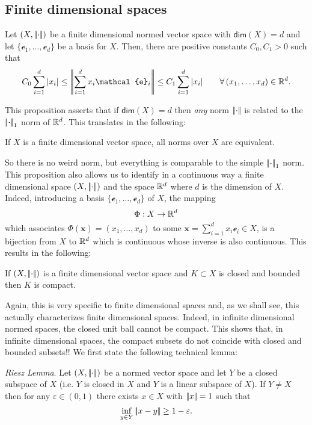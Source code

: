\documentclass{article}
\begin{document}
\subsection{Finite dimensional spaces}
\begin{proposition}
	Let $(X,\left|\negthinspace\left|\cdot\right|\negthinspace\right|)$ be a finite dimensional normed vector space with $\mathsf{dim}(X)=d$ and let $\{\mathcal{e}_1,\ldots,\mathcal{e}_d\}$ be a basis for $X$. Then, there are positive constants $C_0,C_1>0$ such that
	\begin{equation*}
		C_0\sum_{i=1}^{d}|x_i|\leq\norm{\sum_{i=1}^{d}x_i\mathcal{e}_{i}}\leq C_1\sum_{i=1}^{d}|x_i|\qquad\every(x_1,\ldots,x_d)\in\R^{d}.
	\end{equation*}
\end{proposition}
This proposition asserts that if $\mathsf{dim}(X)=d$ then \textit{any} norm $\left|\negthinspace\left|\cdot\right|\negthinspace\right|$ is related to the $\left|\negthinspace\left|\cdot\right|\negthinspace\right|_1$ norm of $\mathbb{R}^{d}$. This translates in the following:
\begin{proposition}
	If $X$ is a finite dimensional vector space, all norms over $X$ are equivalent.
\end{proposition}
So there is no weird norm, but everything is comparable to the simple $\left|\negthinspace\left|\cdot\right|\negthinspace\right|_1$ norm. This proposition also allows us to identify in a continuous way a finite dimensional space $(X,\left|\negthinspace\left|\cdot\right|\negthinspace\right|)$ and the space $\mathbb{R}^{d}$ where $d$ is the dimension of $X$. Indeed, introducing a basis $\{\mathcal{e}_1,\ldots,\mathcal{e}_d\}$ of $X$, the mapping
\begin{equation*}
	\Phi:X\to\mathbb{R}^{d}
\end{equation*}
which associates $\Phi(\mathbf{x})=(x_1,\ldots,x_d)$ to some $\mathbf{x}=\sum_{i=1}^{d}x_i\mathcal{e}_i\in X$, is a bijection from $X$ to $\mathbb{R}^{d}$ which is continuous whose inverse is also continuous. This results in the following:
\begin{corollary}
	If $(X,\left|\negthinspace\left|\cdot\right|\negthinspace\right|)$ is a finite dimensional vector space and $K\subset X$ is closed and bounded then $K$ is compact.
\end{corollary}
Again, this is very speciﬁc to ﬁnite dimensional spaces and, as we shall see, this actually
characterizes ﬁnite dimensional spaces. Indeed, in inﬁnite dimensional normed spaces, the
closed unit ball cannot be compact. This shows that, in inﬁnite dimensional spaces, the
compact subsets do not coincide with closed and bounded subsets!!
We ﬁrst state the following technical lemma:
\begin{lemma}
	\emph{Riesz Lemma}. Let $(X,\left|\negthinspace\left|\cdot\right|\negthinspace\right|)$ be a normed vector space and let $Y$ be a closed subspace of $X$ (i.e. $Y$ is closed in $X$ and $Y$ is a linear subspace of $X$). If $Y\neq X$ then for any $\varepsilon\in(0,1)$ there exists $x\in X$ with $\left|\negthinspace\left|x\right|\negthinspace\right|=1$ such that
	\begin{equation*}
		\inf_{y\in Y}\left|\negthinspace\left|x-y\right|\negthinspace\right|\geq1-\varepsilon.
	\end{equation*}
\end{lemma}
\end{document}
